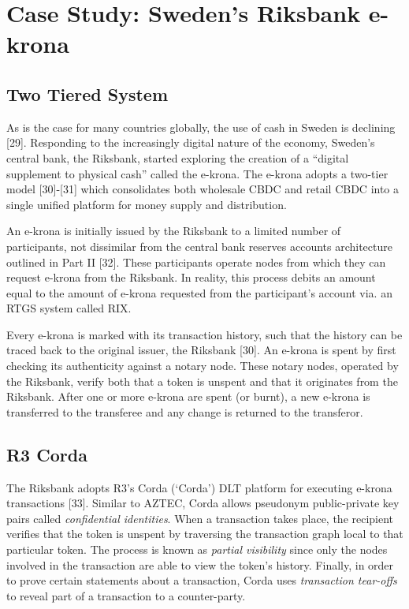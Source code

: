 \section{Case Study: Sweden's Riksbank e-krona}

\subsection{Two Tiered System}

As is the case for many countries globally, the use of cash in Sweden is declining [29]. Responding to the increasingly digital nature of the economy, Sweden's central bank, the Riksbank, started exploring the creation of a ``digital supplement to physical cash'' called the e-krona. The e-krona adopts a two-tier model [30]-[31] which consolidates both wholesale CBDC and retail CBDC into a single unified platform for money supply and distribution. 

An e-krona is initially issued by the Riksbank to a limited number of participants, not dissimilar from the central bank reserves accounts architecture outlined in Part II [32]. These participants operate nodes from which they can request e-krona from the Riksbank. In reality, this process debits an amount equal to the amount of e-krona requested from the participant's account via. an RTGS system called RIX. 

Every e-krona is marked with its transaction history, such that the history can be traced back to the original issuer, the Riksbank [30]. An e-krona is spent by first checking its authenticity against a notary node. These notary nodes, operated by the Riksbank, verify both that a token is unspent and that it originates from the Riksbank. After one or more e-krona are spent (or burnt), a new e-krona is transferred to the transferee and any change is returned to the transferor.

\subsection{R3 Corda}

The Riksbank adopts R3's Corda (`Corda') DLT platform for executing e-krona transactions [33]. Similar to AZTEC, Corda allows pseudonym public-private key pairs called \textit{confidential identities}. When a transaction takes place, the recipient verifies that the token is unspent by traversing the transaction graph local to that particular token. The process is known as \textit{partial visibility} since only the nodes involved in the transaction are able to view the token's history. Finally, in order to prove certain statements about a transaction, Corda uses \textit{transaction tear-offs} to reveal part of a transaction to a counter-party.

